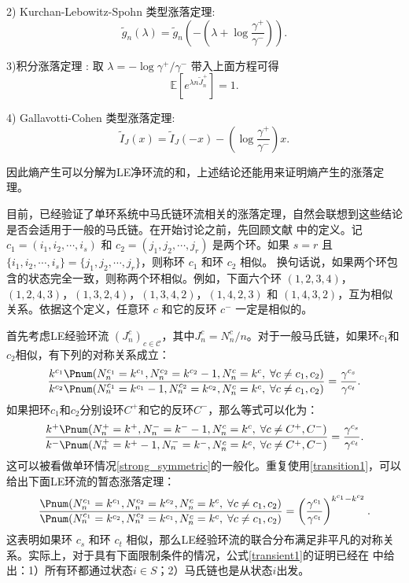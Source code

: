 2) Kurchan-Lebowitz-Spohn 类型涨落定理:
\begin{equation*}
\tilde{g}_n(\lambda)=\tilde{g}_n\left(-\left(\lambda+\log\frac{\gamma^+}{\gamma^-}\right)\right).
\end{equation*}

3)积分涨落定理 : 取 $\lambda = -\log \gamma^+/\gamma^-$ 带入上面方程可得
\begin{equation*}
\mathbb{E}\left[e^{\lambda n\tilde{J}^+_n}\right]=1.
\end{equation*}

4) Gallavotti-Cohen 类型涨落定理:
\begin{equation*}
\tilde{I}_J(x)=\tilde{I}_J(-x)-\left(\log\frac{\gamma^+}{\gamma^-}\right)x.
\end{equation*}

因此熵产生可以分解为LE净环流\cite{Seifert_2012}的和，上述结论还能用来证明熵产生的涨落定理。


目前，已经验证了单环系统中马氏链环流相关的涨落定理，自然会联想到这些结论是否会适用于一般的马氏链。在开始讨论之前，先回顾文献 \cite{jia2016cycle}中的定义。记 $c_1=(i_1,i_2,\cdots,i_s)$ 和 $c_2=(j_1,j_2,\cdots,j_r)$ 是两个环。如果 $s=r$ 且 $\{i_1,i_2,\cdots,i_s\}=\{j_1,j_2,\cdots,j_r\}$，则称环 $c_1$ 和环 $c_2$ 相似。
换句话说，如果两个环包含的状态完全一致，则称两个环相似。例如，下面六个环 $(1,2,3,4)$，$(1,2,4,3)$，$(1,3,2,4)$，$(1,3,4,2)$，$(1,4,2,3)$ 和 $(1,4,3,2)$，互为相似关系。依据这个定义，任意环 $c$ 和它的反环 $c^-$ 一定是相似的。

首先考虑LE经验环流 $(J^c_n)_{c\in\mathcal{C}}$，其中$J_n^c=N_n^c/n$。对于一般马氏链，如果环$c_1$和$c_2$相似，有下列的对称关系成立：
\begin{equation}\label{transient1}
    \frac{k^{c_1} \Pnum(N^{c_1}_n=k^{c_1},N^{c_2}_n=k^{c_2}-1,N^{c}_n=k^{c},\;\forall c\neq c_1,c_2)}
    {k^{c_2} \Pnum(N^{c_1}_n=k^{c_1} -1,N^{c_2}_n=k^{c_2},N^{c}_n=k^{c},\;\forall c\neq c_1,c_2)}
    = \frac{\gamma^{c_s}}{\gamma^{c_t}}.
\end{equation}
如果把环$c_1$和$c_2$分别设环$C^+$和它的反环$C^-$，那么等式可以化为：
\begin{equation*}
    \frac{k^{+} \Pnum(N^{+}_n=k^{+},N^{-}_n=k^{-}-1,N^{c}_n=k^{c},\;\forall c\neq C^+,C^-)}
    {k^{-} \Pnum(N^{+}_n=k^{+} -1,N^{-}_n=k^{-},N^{c}_n=k^{c},\;\forall c\neq C^+,C^-)}
    = \frac{\gamma^{c_s}}{\gamma^{c_t}}.
\end{equation*}
这可以被看做单环情况\ref{strong_symmetric}的一般化。重复使用\ref{transition1}，可以给出下面LE环流的暂态涨落定理：
\begin{equation}\label{transient2}
    \frac{\Pnum(N^{c_1}_n=k^{c_1},N^{c_2}_n=k^{c_2},N^{c}_n=k^{c},\;\forall c\neq c_1,c_2)}
    {\Pnum(N^{c_1}_n=k^{c_2},N^{c_2}_n=k^{c_1},N^{c}_n=k^{c},\;\forall c\neq c_1,c_2)}
    = \left(\frac{\gamma^{c_1}}{\gamma^{c_t}}\right)^{k^{c_1}-k^{c_2}}.
\end{equation}
这表明如果环 $c_s$ 和环 $c_t$ 相似，那么LE经验环流的联合分布满足非平凡的对称关系。实际上，对于具有下面限制条件的情况，公式\ref{transient1}的证明已经在 \cite{jia2016cycle}中给出：1）所有环都通过状态$i\in S$；2）马氏链也是从状态$i$出发。

